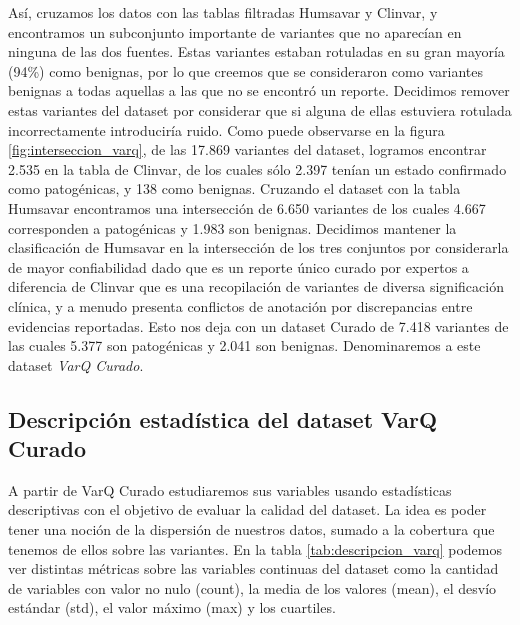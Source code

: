 Así, cruzamos los datos con las tablas filtradas Humsavar y Clinvar, y encontramos un subconjunto importante de variantes que no aparecían en ninguna de las dos fuentes. Estas variantes estaban rotuladas en su gran mayoría (94\%) como benignas, por lo que creemos que se consideraron como variantes benignas a todas aquellas a las que no se encontró un reporte. Decidimos remover estas variantes del dataset por considerar que si alguna de ellas estuviera rotulada incorrectamente introduciría ruido. Como puede observarse en la figura \ref{fig:interseccion_varq}, de las 17.869 variantes del dataset, logramos encontrar 2.535 en la tabla de Clinvar, de los cuales sólo 2.397 tenían un estado confirmado como patogénicas, y 138 como benignas. Cruzando el dataset con la tabla Humsavar encontramos una intersección de 6.650 variantes de los cuales 4.667 corresponden a patogénicas y 1.983 son benignas. Decidimos mantener la clasificación de Humsavar en la intersección de los tres conjuntos por considerarla de mayor confiabilidad dado que es un reporte único curado por expertos a diferencia de Clinvar que es una recopilación de variantes de diversa significación clínica, y a menudo presenta conflictos de anotación por discrepancias entre evidencias reportadas. Esto nos deja con un dataset Curado de 7.418 variantes de las cuales 5.377 son patogénicas y 2.041 son benignas. Denominaremos a este dataset \textit{VarQ Curado}. 


\subsection{Descripción estadística del dataset VarQ Curado}

A partir de VarQ Curado estudiaremos sus variables usando estadísticas descriptivas con el objetivo de evaluar la calidad del dataset. La idea es poder tener una noción de la dispersión de nuestros datos, sumado a la cobertura que tenemos de ellos sobre las variantes. En la tabla \ref{tab:descripcion_varq} podemos ver distintas métricas sobre las variables continuas del dataset como la cantidad de variables con valor no nulo (count), la media de los valores (mean), el desvío estándar (std), el valor máximo (max) y los cuartiles. 

